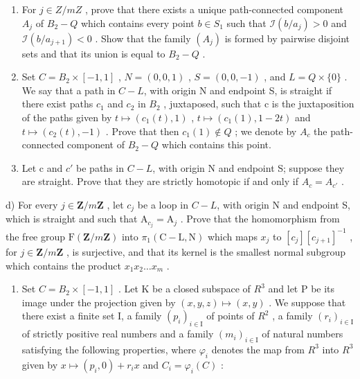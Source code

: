 \begin{enumerate}
\def\labelenumi{\alph{enumi})}
\item
  For \(j \in Z/mZ\) , prove that there exists a unique path-connected component \(A_{j}\) of \(B_{2}-Q\) which contains every point \(b \in S_{1}\) such that \(\mathcal{I}(b/a_{j}) > 0\) and \(\mathcal{I}(b/a_{j+1}) < 0\) . Show that the family \((A_{j})\) is formed by pairwise disjoint sets and that its union is equal to \(B_{2}-Q\) .
\item
   Set \(C = B_{2} \times [-1, 1]\) , \(N = (0, 0, 1)\) , \(S = (0, 0, -1)\) , and \(L = Q \times \{0\}\) . We say that a path in \(C-L\), with origin N and endpoint S, is straight if there exist paths \(c_{1}\) and \(c_{2}\) in \(B_{2}\) , juxtaposed, such that c is the juxtaposition of the paths given by \(t \mapsto (c_{1}(t), 1)\) , \(t \mapsto (c_{1}(1), 1 - 2t)\) and \(t \mapsto (c_{2}(t), -1)\) . Prove that then \(c_{1}(1) \notin Q\) ; we denote by \(A_{c}\) the path-connected component of \(B_{2}-Q\) which contains this point.
\item
   Let c and \(c'\) be paths in \(C-L\), with origin N and endpoint S; suppose they are straight. Prove that they are strictly homotopic if and only if \(A_{c} = A_{c'}\) .
\end{enumerate}

d) For every \(j \in \mathbf{Z}/m\mathbf{Z}\) , let \(c_j\) be a loop in \(C-L\), with origin N and endpoint S, which is straight and such that \(\mathrm{A}_{c_j} = \mathrm{A}_j\) . Prove that the homomorphism from the free group \(\mathrm{F}(\mathbf{Z}/m\mathbf{Z})\) into \(\pi_1(\mathrm{C}-\mathrm{L},\mathrm{N})\) which maps \(x_j\) to \([c_j][c_{j+1}]^{-1}\) , for \(j \in \mathbf{Z}/m\mathbf{Z}\) , is surjective, and that its kernel is the smallest normal subgroup which contains the product \(x_1x_2 \ldots x_m\) .

\begin{enumerate}
\def\labelenumi{\arabic{enumi})}
\setcounter{enumi}{24}
\tightlist
\item
   Set \(C = B_{2} \times [-1, 1]\) . Let K be a closed subspace of \(R^{3}\) and let P be its image under the projection given by \((x, y, z) \mapsto (x, y)\) . We suppose that there exist a finite set I, a family \((p_{i})_{i \in \mathrm{I}}\) of points of \(R^{2}\) , a family \((r_{i})_{i \in \mathrm{I}}\) of strictly positive real numbers and a family \((m_{i})_{i \in \mathrm{I}}\) of natural numbers satisfying the following properties, where \(\varphi_{i}\) denotes the map from \(R^{3}\) into \(R^{3}\) given by \(x \mapsto (p_{i}, 0) + r_{i}x\) and \(C_{i} = \varphi_{i}(C) \) :
\end{enumerate}

